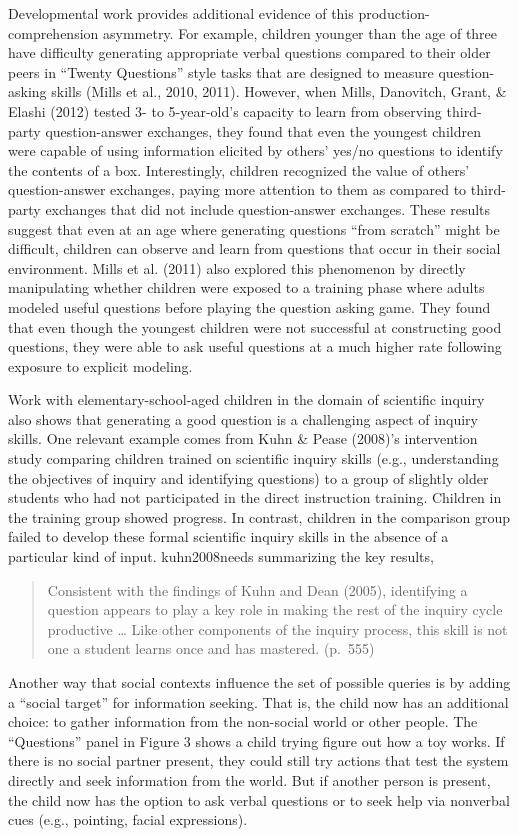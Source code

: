 \documentclass[oneside]{report}
\begin{document}
Developmental work provides additional evidence of this
production-comprehension asymmetry. For example, children younger than
the age of three have difficulty generating appropriate verbal questions
compared to their older peers in ``Twenty Questions'' style tasks that
are designed to measure question-asking skills (Mills et al., 2010,
2011). However, when Mills, Danovitch, Grant, \& Elashi (2012) tested 3-
to 5-year-old's capacity to learn from observing third-party
question-answer exchanges, they found that even the youngest children
were capable of using information elicited by others' yes/no questions
to identify the contents of a box. Interestingly, children recognized
the value of others' question-answer exchanges, paying more attention to
them as compared to third-party exchanges that did not include
question-answer exchanges. These results suggest that even at an age
where generating questions ``from scratch'' might be difficult, children
can observe and learn from questions that occur in their social
environment. Mills et al. (2011) also explored this phenomenon by
directly manipulating whether children were exposed to a training phase
where adults modeled useful questions before playing the question asking
game. They found that even though the youngest children were not
successful at constructing good questions, they were able to ask useful
questions at a much higher rate following exposure to explicit modeling.

Work with elementary-school-aged children in the domain of scientific
inquiry also shows that generating a good question is a challenging
aspect of inquiry skills. One relevant example comes from Kuhn \& Pease
(2008)'s intervention study comparing children trained on scientific
inquiry skills (e.g., understanding the objectives of inquiry and
identifying questions) to a group of slightly older students who had not
participated in the direct instruction training. Children in the
training group showed progress. In contrast, children in the comparison
group failed to develop these formal scientific inquiry skills in the
absence of a particular kind of input. kuhn2008needs summarizing the key
results,
\begin{quote}
Consistent with the findings of Kuhn and Dean (2005), identifying a
question appears to play a key role in making the rest of the inquiry
cycle productive \ldots{} Like other components of the inquiry process,
this skill is not one a student learns once and has mastered. (p.~555)
\end{quote}
Another way that social contexts influence the set of possible queries
is by adding a ``social target'' for information seeking. That is, the
child now has an additional choice: to gather information from the
non-social world or other people. The ``Questions'' panel in Figure 3
shows a child trying figure out how a toy works. If there is no social
partner present, they could still try actions that test the system
directly and seek information from the world. But if another person is
present, the child now has the option to ask verbal questions or to seek
help via nonverbal cues (e.g., pointing, facial expressions).
\end{document}
